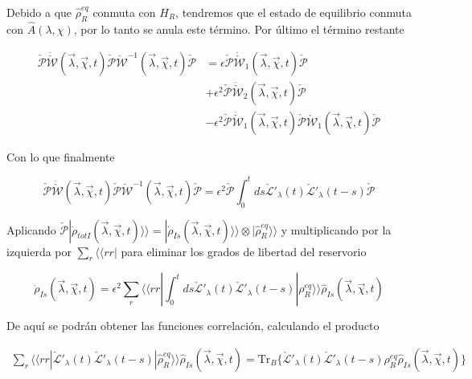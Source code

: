 \begin{appendixs}
Debido a que $\hat{\rho}^{eq}_{R}$ conmuta con $H_{R}$, tendremos que el estado de equilibrio conmuta con $\hat{A}(\lambda,\chi)$, por lo tanto se anula este término. Por último el término restante

\begin{align*}
    \check{\mathcal{P}}\dot{\check{\mathcal{W}}}(\vec{\lambda},\vec{\chi},t)\check{\mathcal{P}}\check{\mathcal{W}}^{-1}(\vec{\lambda},\vec{\chi},t)\check{\mathcal{P}} & = \epsilon \check{\mathcal{P}}\dot{\check{\mathcal{W}}}_{1}(\vec{\lambda},\vec{\chi},t)\check{\mathcal{P}} \\
    & + \epsilon^{2}\check{\mathcal{P}}\dot{\check{\mathcal{W}}}_{2}(\vec{\lambda},\vec{\chi},t)\check{\mathcal{P}} \\
    & - \epsilon^{2}\check{\mathcal{P}}\dot{\check{\mathcal{W}}}_{1}(\vec{\lambda},\vec{\chi},t)\check{\mathcal{P}}  \check{\mathcal{W}}_{1}(\vec{\lambda},\vec{\chi},t) \check{\mathcal{P}}
\end{align*}

Con lo que finalmente

\begin{equation*}
    \check{\mathcal{P}}\dot{\check{\mathcal{W}}}(\vec{\lambda},\vec{\chi},t)\check{\mathcal{P}}\check{\mathcal{W}}^{-1}(\vec{\lambda},\vec{\chi},t)\check{\mathcal{P}} = \epsilon^{2}\check{\mathcal{P}}\int_{0}^{t}ds \check{\mathcal{L}}'_{\lambda}(t)\check{\mathcal{L}}'_{\lambda}(t-s)\check{\mathcal{P}} 
\end{equation*}

Aplicando $\check{\mathcal{P}}|\dot{\rho}_{totI}(\vec{\lambda},\vec{\chi},t)\rangle \rangle = |\dot{\rho}_{Is}(\vec{\lambda},\vec{\chi},t)\rangle \rangle \otimes |\hat{\rho}^{eq}_{R}\rangle \rangle$ y multiplicando por la izquierda por $\sum_{r}\langle \langle rr|$ para eliminar los grados de libertad del reservorio

\begin{equation*}
    \dot{\rho}_{Is}(\vec{\lambda},\vec{\chi},t) = \epsilon^{2} \sum_{r}\langle \langle rr|\int_{0}^{t}ds \check{\mathcal{L}}'_{\lambda}(t)\check{\mathcal{L}}'_{\lambda}(t-s)|\rho_{R}^{eq}\rangle \rangle \hat{\rho}_{Is}(\vec{\lambda},\vec{\chi},t)
\end{equation*}

De aquí se podrán obtener las funciones correlación, calculando el producto

\begin{align*}
    \sum_{r}\langle \langle rr| \check{\mathcal{L}}'_{\lambda}(t)\check{\mathcal{L}}'_{\lambda}(t-s)|\hat{\rho}_{R}^{eq}\rangle \rangle \hat{\rho}_{Is}(\vec{\lambda},\vec{\chi},t) = \text{Tr}_{B}\{\check{\mathcal{L}}'_{\lambda}(t)\check{\mathcal{L}}'_{\lambda}(t-s)\rho_{R}^{eq}\hat{\rho}_{Is}(\vec{\lambda},\vec{\chi},t) \}
\end{align*}


\end{appendixs}
